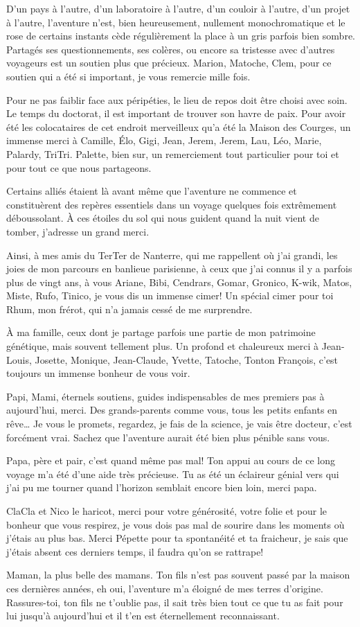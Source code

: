 D'un pays à l'autre, d'un laboratoire à l'autre, d'un couloir à l'autre,
d'un projet à l'autre, l'aventure n'est, bien heureusement, nullement
monochromatique et le rose de certains instants cède régulièrement la
place à un gris parfois bien sombre. Partagés ses questionnements, ses
colères, ou encore sa tristesse avec d'autres voyageurs est un soutien
plus que précieux. Marion, Matoche, Clem, pour ce soutien qui a été si
important, je vous remercie mille fois.

Pour ne pas faiblir face aux péripéties, le lieu de repos doit être
choisi avec soin. Le temps du doctorat, il est important de trouver son
havre de paix. Pour avoir été les colocataires de cet endroit
merveilleux qu'a été la Maison des Courges, un immense merci à Camille,
Élo, Gigi, Jean, Jerem, Jerem, Lau, Léo, Marie, Palardy, TriTri.
Palette, bien sur, un remerciement tout particulier pour toi et pour
tout ce que nous partageons.

Certains alliés étaient là avant même que l'aventure ne commence et
constituèrent des repères essentiels dans un voyage quelques fois
extrêmement déboussolant. À ces étoiles du sol qui nous guident quand la
nuit vient de tomber, j'adresse un grand merci.

Ainsi, à mes amis du TerTer de Nanterre, qui me rappellent où j'ai
grandi, les joies de mon parcours en banlieue parisienne, à ceux que
j'ai connus il y a parfois plus de vingt ans, à vous Ariane, Bibi,
Cendrars, Gomar, Gronico, K-wik, Matos, Miste, Rufo, Tinico, je vous dis
un immense cimer! Un spécial cimer pour toi Rhum, mon frérot, qui n'a
jamais cessé de me surprendre.

À ma famille, ceux dont je partage parfois une partie de mon patrimoine
génétique, mais souvent tellement plus. Un profond et chaleureux merci à
Jean-Louis, Josette, Monique, Jean-Claude, Yvette, Tatoche, Tonton
François, c'est toujours un immense bonheur de vous voir.

Papi, Mami, éternels soutiens, guides indispensables de mes premiers pas
à aujourd'hui, merci. Des grands-parents comme vous, tous les petits
enfants en rêve\ldots{} Je vous le promets, regardez, je fais de la
science, je vais être docteur, c'est forcément vrai. Sachez que
l'aventure aurait été bien plus pénible sans vous.

Papa, père et pair, c'est quand même pas mal! Ton appui au cours de ce
long voyage m'a été d'une aide très précieuse. Tu as été un éclaireur
génial vers qui j'ai pu me tourner quand l'horizon semblait encore bien
loin, merci papa.

ClaCla et Nico le haricot, merci pour votre générosité, votre folie et
pour le bonheur que vous respirez, je vous dois pas mal de sourire dans
les moments où j'étais au plus bas. Merci Pépette pour ta spontanéité et
ta fraicheur, je sais que j'étais absent ces derniers temps, il faudra
qu'on se rattrape!

Maman, la plus belle des mamans. Ton fils n'est pas souvent passé par la
maison ces dernières années, eh oui, l'aventure m'a éloigné de mes
terres d'origine. Rassures-toi, ton fils ne t'oublie pas, il sait très
bien tout ce que tu as fait pour lui jusqu'à aujourd'hui et il t'en est
éternellement reconnaissant.
